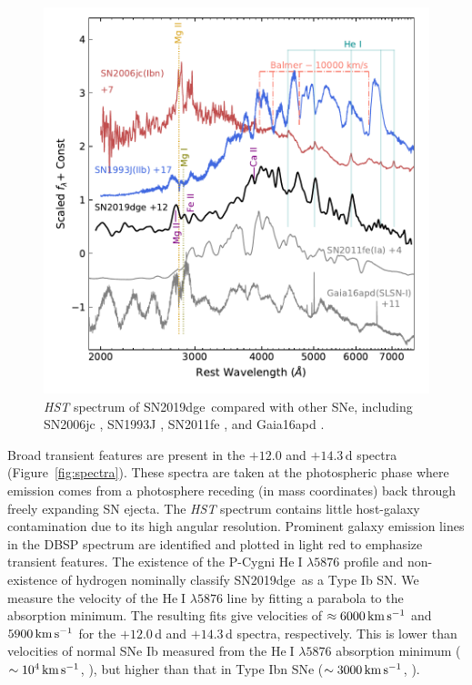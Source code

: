 \documentclass[twocolumn]{aastex63}
\newcommand{\name}{SN2019dge}
\def\ion#1#2{#1$\;${\footnotesize\rm{#2}}\relax}
\begin{document}
\begin{CJK*}{UTF8}{gbsn}
\begin{figure}[htbp!]
	\centering
	\includegraphics[width=\columnwidth]{figures/hst_all.pdf}
	\caption{\textit{HST} spectrum of \name\ compared with other SNe, including SN2006jc 
		\citep{Bufano2009}, SN1993J \citep{Jeffery1994}, SN2011fe \citep{Mazzali2014}, and Gaia16apd 
		\citep{Yan2017}.
		\label{fig:hst}}
\end{figure}

Broad transient features are present in the $+12.0$ and $+14.3$\,d spectra (Figure~\ref{fig:spectra}). 
These spectra are taken at the photospheric phase where emission comes from a photosphere 
receding (in mass coordinates) back through freely expanding SN ejecta. 
The \textit{HST} spectrum contains little host-galaxy contamination 
due to its high angular resolution. Prominent galaxy emission lines in the DBSP 
spectrum are identified and plotted in light red to emphasize transient features. The existence of the
P-Cygni \ion{He}{I} $\lambda5876$ profile and non-existence of hydrogen nominally classify \name\ as 
a Type Ib SN. We measure the velocity of the \ion{He}{I} $\lambda5876$ line by fitting a parabola to the 
absorption minimum. The resulting fits give velocities of $\approx 6000\, {\rm km\,s^{-1}}$ and $ 5900\, 
{\rm km\,s^{-1}}$ for the $+12.0$\,d and $+14.3$\,d spectra, respectively. This is lower than velocities 
of normal SNe Ib measured from the \ion{He}{I} $\lambda5876$ absorption minimum ($\sim 10^4\, \rm 
km\, s^{-1}$, \citealt{Liu2016}), but higher than that in Type Ibn SNe ($\sim 3000\, \rm km\, s^{-1}$, 
\citealt{Hosseinzadeh2017}). 


\end{CJK*}
\end{document}
